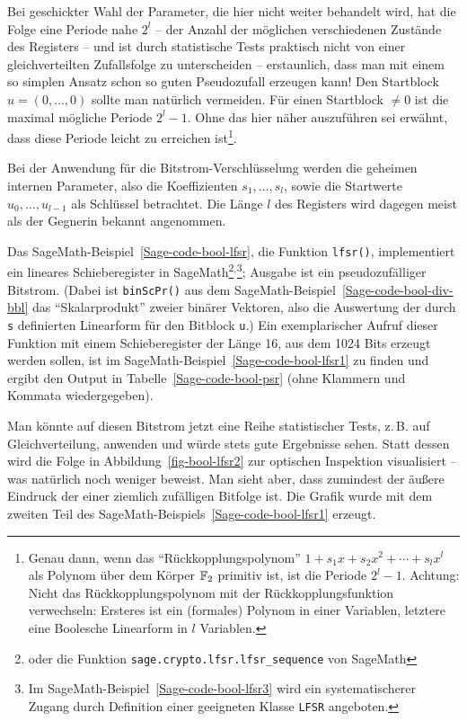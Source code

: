 \begin{refsegment}
Bei geschickter Wahl der Parameter, die hier nicht weiter
behandelt wird, hat die Folge eine Periode nahe $2^l$ -- der Anzahl der
möglichen verschiedenen Zustände des Registers -- und ist durch statistische
Tests praktisch nicht von einer gleichverteilten Zufallsfolge zu
unterscheiden \cite{Golo1982} -- erstaunlich, dass man mit einem so
simplen Ansatz schon so guten Pseudozufall erzeugen kann! Den
Startblock $u = (0, \ldots, 0)$ sollte man natürlich vermeiden.
Für einen Startblock $\neq 0$ ist die maximal mögliche Periode $2^l - 1$.
Ohne das hier näher auszuführen sei erwähnt, dass diese Periode
leicht zu erreichen ist\footnote{%
  Genau dann, wenn das "`Rückkopplungspolynom"'
  $1 + s_1 x + s_2 x^2 + \cdots + s_l x^l$ als Polynom über
  dem Körper $\mathbb{F}_2$ primitiv ist, ist die Periode $2^l - 1$.
  Achtung: Nicht das Rückkopplungspolynom mit der
  Rückkopplungsfunktion verwechseln: Ersteres ist ein (formales)
  Polynom in einer Variablen, letztere eine Boolesche Linearform
  in $l$ Variablen.
}.

Bei der Anwendung für die Bitstrom-Verschlüsselung werden die
geheimen internen Parameter, also die Koeffizienten $s_1, \ldots, s_l$,
sowie die Startwerte $u_0, \ldots, u_{l-1}$ als Schlüssel betrachtet.
Die Länge $l$ des Registers wird dagegen meist als der Gegnerin bekannt
angenommen.

Das SageMath-Beispiel~\ref{Sage-code-bool-lfsr}, die Funktion {\tt lfsr()},
implementiert ein lineares
Schieberegister
in SageMath\footnote{%
  oder die Funktion {\tt sage.crypto.lfsr.lfsr\_sequence} von SageMath
}$^,$\footnote{%
  Im SageMath-Beispiel~\ref{Sage-code-bool-lfsr3}
  wird ein systematischerer Zugang durch Definition einer geeigneten
  Klasse {\tt LFSR} angeboten.
}; Ausgabe ist ein
pseudozufälliger Bitstrom. (Dabei ist {\tt binScPr()} aus dem
SageMath-Beispiel~\ref{Sage-code-bool-div-bbl} das "`Skalarprodukt"'
zweier binärer Vektoren, also die Auswertung der durch {\tt s}
definierten Linearform für den Bitblock {\tt u}.)
Ein exemplarischer Aufruf dieser Funktion mit einem Schieberegister der
Länge 16, aus dem 1024 Bits erzeugt werden sollen, ist im
SageMath-Beispiel~\ref{Sage-code-bool-lfsr1} zu finden
und ergibt den Output in Tabelle~\ref{Sage-code-bool-psr}
(ohne Klammern und Kommata wiedergegeben).

Man könnte auf diesen Bitstrom jetzt eine Reihe statistischer
Tests, z.\,B.
auf Gleichverteilung, anwenden und würde stets gute Ergebnisse sehen.
Statt dessen wird die Folge in Abbildung~\ref{fig-bool-lfsr2}
zur optischen Inspektion visualisiert -- was natürlich noch weniger beweist.
Man sieht aber, dass zumindest der äußere Eindruck der einer
ziemlich zufälligen Bitfolge ist. Die Grafik wurde mit dem
zweiten Teil des SageMath-Beispiels~\ref{Sage-code-bool-lfsr1} erzeugt.


\end{refsegment}
